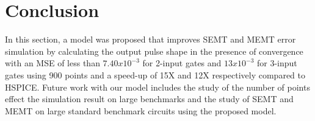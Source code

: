 \section{Conclusion}
In this section, a model was proposed that improves SEMT and MEMT error simulation by calculating the output pulse shape in the presence of convergence with an MSE of less than $7.40x10^{-3}$ for 2-input gates and $13x10^{-3}$ for 3-input gates  using 900 points and a speed-up of 15X and 12X respectively compared to HSPICE. Future work with our model includes the study of the number of points effect the simulation result on large benchmarks and the study of SEMT and MEMT on large standard benchmark circuits using the proposed model. 